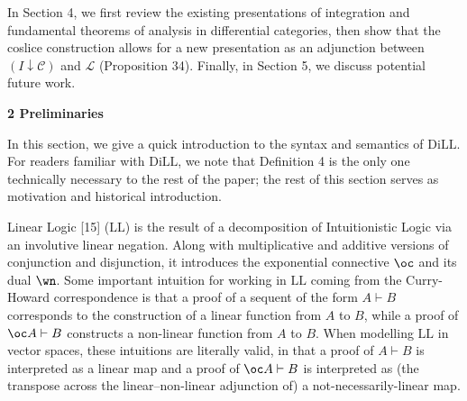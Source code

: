  
 
In Section 4, we first review the existing presentations of integration and fundamental theorems of analysis in differential categories, then show that the coslice construction allows for a new presentation as an adjunction between $(I\downarrow\mathscr{C})$ and $\mathscr{L}$ (Proposition 34). Finally, in Section 5, we discuss potential future work.\par
 
 
 


 
\par\medskip\noindent\textbf{2 Preliminaries}\par
 
 
In this section, we give a quick introduction to the syntax and semantics of $\mathrm{DiLL}$. For readers familiar with $\mathrm{DiLL}$, we note that Definition 4 is the only one technically necessary to the rest of the paper; the rest of this section serves as motivation and historical introduction.\par
 
 
 
Linear Logic [15] ($\mathrm{LL}$) is the result of a decomposition of Intuitionistic Logic via an involutive linear negation. Along with multiplicative and additive versions of conjunction and disjunction, it introduces the exponential connective $\oc$ and its dual $\wn$. Some important intuition for working in $\mathrm{LL}$ coming from the Curry-Howard correspondence is that a proof of a sequent of the form $A\vdash B$ corresponds to the construction of a linear function from $A$ to $B$, while a proof of $\oc A\vdash B$ constructs a non-linear function from $A$ to $B$. When modelling $\mathrm{LL}$ in vector spaces, these intuitions are literally valid, in that a proof of $A\vdash B$ is interpreted as a linear map and a proof of $\oc A\vdash B$ is interpreted as (the transpose across the linear–non-linear adjunction of) a not-necessarily-linear map.\par
 
 
 
